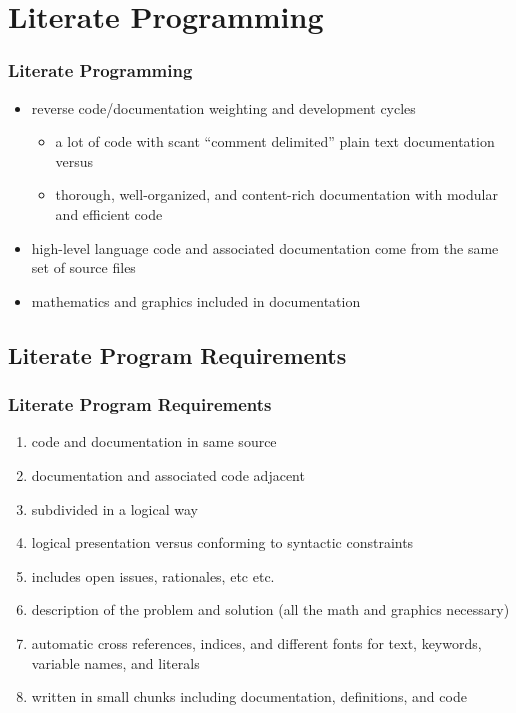 \documentclass{beamer}
\makeatletter
\newcommand*{\etc}{%
  \@ifnextchar{.}%
  {etc}%
  {etc.\@\xspace}%
}
\makeatother
\begin{document}
\section{Literate Programming}
\begin{frame}
  \frametitle{Literate Programming}
  \begin{itemize}
    \item reverse code/documentation weighting and development cycles
      \begin{itemize}
        \item a lot of code with scant ``comment delimited'' plain text documentation versus
        \item thorough, well-organized, and content-rich documentation with modular and efficient code
      \end{itemize}
    \item high-level language code and associated documentation come from the same set of source files
    \item mathematics and graphics included in documentation
  \end{itemize}
\end{frame}

\subsection{Literate Program Requirements}
\begin{frame}
  \frametitle{Literate Program Requirements\cite{childs}}
  \begin{enumerate}
    \item code and documentation in same source
    \item documentation and associated code adjacent 
    \item subdivided in a logical way
    \item logical presentation versus conforming to syntactic constraints
    \item includes open issues, rationales, \etc 
    \item description of the problem and solution
      (all the math and graphics necessary)
    \item automatic cross references, indices, and different fonts for text, keywords, 
      variable names, and literals 
    \item written in small chunks including documentation, definitions, and code
  \end{enumerate}
\end{frame}
\end{document}
